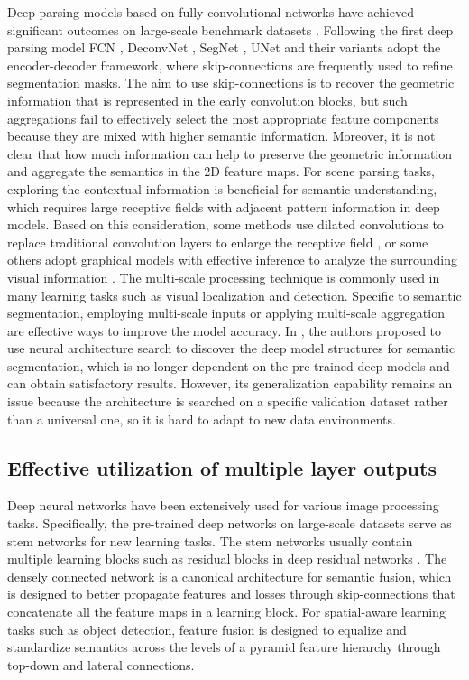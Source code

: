 \documentclass[10pt,twocolumn,twoside]{IEEEtran}
\begin{document}
Deep parsing models based on fully-convolutional networks \cite{CVPR15:FCN} have achieved significant outcomes on large-scale benchmark datasets \cite{CVPR16:CITYSCAPES,CVPR17:ADE20K}. Following the first deep parsing model FCN \cite{CVPR15:FCN}, DeconvNet \cite{CVPR15:DECONV}, SegNet \cite{TPAMI:SEGNET}, UNet \cite{MICCAI15:UNET} and their variants \cite{ARXIV:CONVCRF,CVPR17:GFRN,ARXIV:DECODER} adopt the encoder-decoder framework, where skip-connections are frequently used to refine segmentation masks. The aim to use skip-connections is to recover the geometric information that is represented in the early convolution blocks, but such aggregations fail to effectively select the most appropriate feature components because they are mixed with higher semantic information. Moreover, it is not clear that how much information can help to preserve the geometric information and aggregate the semantics in the 2D feature maps. For scene parsing tasks, exploring the contextual information is beneficial for semantic understanding, which requires large receptive fields with adjacent pattern information in deep models. Based on this consideration, some methods use dilated convolutions to replace traditional convolution layers to enlarge the receptive field \cite{ARXIV:DILATED}, or some others adopt graphical models with effective inference to analyze the surrounding visual information \cite{TPAMI:DAG}. The multi-scale processing technique is commonly used in many learning tasks such as visual localization and detection. Specific to semantic segmentation, employing multi-scale inputs \cite{CVPR17:REFINENET,CVPR16:ATTENTION_SCALE} or applying multi-scale aggregation \cite{CVPR17:PSPNET} are effective ways to improve the model accuracy. In \cite{CVPR19:AUTODEEPLAB}, the authors proposed to use neural architecture search to discover the deep model structures for semantic segmentation, which is no longer dependent on the pre-trained deep models and can obtain satisfactory results. However, its generalization capability remains an issue because the architecture is searched on a specific validation dataset rather than a universal one, so it is hard to adapt to new data environments.

\subsection{Effective utilization of multiple layer outputs}

Deep neural networks have been extensively used for various image processing tasks. Specifically, the pre-trained deep networks on large-scale datasets serve as stem networks for new learning tasks. The stem networks usually contain multiple learning blocks such as residual blocks in deep residual networks \cite{CVPR16:RESNET}. The densely connected network \cite{CVPR17:DENSENET} is a canonical architecture for semantic fusion, which is designed to better propagate features and losses through skip-connections that concatenate all the feature maps in a learning block. For spatial-aware learning tasks such as object detection, feature fusion \cite{CVPR17:FPN} is designed to equalize and standardize semantics across the levels of a pyramid feature hierarchy through top-down and lateral connections. 
\end{document}
